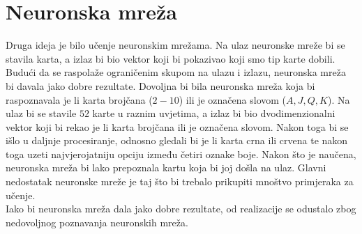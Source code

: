 \documentclass[times, zavrsni, numeric, utf8]{fer}
\begin{document}
\section{Neuronska mreža}
\hspace*{0.5cm}Druga ideja je bilo učenje neuronskim mrežama. Na ulaz neuronske mreže bi se stavila karta, a izlaz bi bio vektor koji bi pokazivao koji smo tip karte dobili. Budući da se raspolaže ograničenim skupom na ulazu i izlazu, neuronska mreža bi davala jako dobre rezultate. Dovoljna bi bila neuronska mreža koja bi raspoznavala je li karta brojčana ($2 - 10$) ili je označena slovom ($A, J, Q, K$). Na ulaz bi se stavile $52$ karte u raznim uvjetima, a izlaz bi bio dvodimenzionalni vektor koji bi rekao je li karta brojčana ili je označena slovom. Nakon toga bi se išlo u daljnje procesiranje, odnosno gledali bi je li karta crna ili crvena te nakon toga uzeti najvjerojatniju opciju između četiri oznake boje. Nakon što je naučena, neuronska mreža bi lako prepoznala kartu koja bi joj došla na ulaz. Glavni nedostatak neuronske mreže je taj što bi trebalo prikupiti mnoštvo primjeraka za učenje.\\
Iako bi neuronska mreža dala jako dobre rezultate, od realizacije se odustalo zbog nedovoljnog poznavanja neuronskih mreža. 
\end{document}
